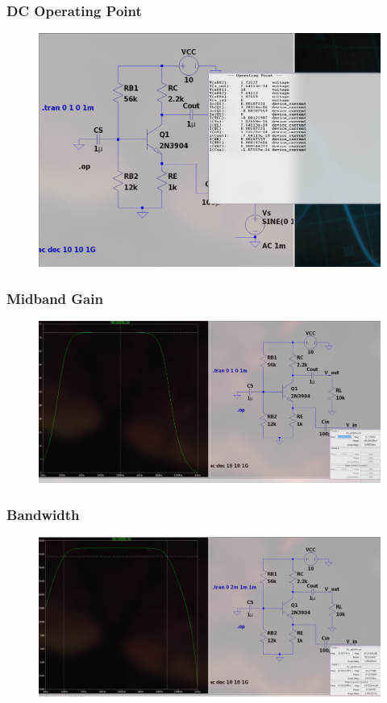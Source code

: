\documentclass{article}
\begin{document}
\subsubsection{DC Operating Point}
\begin{figure}[h!]
        \centering
        \includegraphics[width=0.7\linewidth]{figs/bjt_cb_op.png}
    \end{figure}
\pagebreak
\subsubsection{Midband Gain}
\begin{figure}[h!]
        \centering
        \includegraphics[width=0.7\linewidth]{figs/bjt_cb_mb.png}
    \end{figure}
\subsubsection{Bandwidth}
\begin{figure}[h!]
        \centering
        \includegraphics[width=0.7\linewidth]{figs/bjt_cb_bw.png}
    \end{figure}
\end{document}
